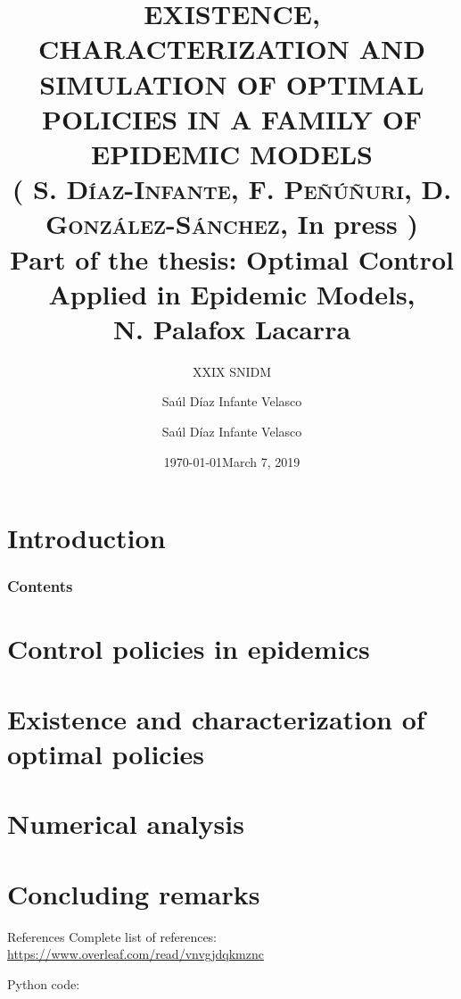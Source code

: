\documentclass[10pt]{beamer}
\title{
    EXISTENCE, CHARACTERIZATION AND SIMULATION OF OPTIMAL
    POLICIES IN A FAMILY OF EPIDEMIC MODELS
    \\
        \small{
            (%
                \textsc{%
                    S. D\'iaz-Infante, %
                    F. Pe\~n\'u\~nuri, %
                    D. Gonz\'alez-S\'anchez}, In press%
            )\\%
        Part of the thesis:
        Optimal Control Applied in Epidemic Models,
        \\
        N. Palafox Lacarra
        \\
        }{}
}
\subtitle{XXIX SNIDM}
\date{\today}
\author{Sa\'ul D\'iaz Infante Velasco}
\institute{CONACYT-Universidad de Sonora}
\author[Sa\'ul D\'iaz Infante Velasco]{
        Sa\'ul D\'iaz Infante Velasco
    }
\date[\ccbyncsa]{March 7, 2019 }
\begin{document}
    \begin{frame}[plain]
        \maketitle
    \end{frame}
    \section{Introduction}
        
        \begin{frame}
            \frametitle{Contents}
            \tableofcontents
        \end{frame}
    \section{Control policies in epidemics}
        
        
    \section{Existence and characterization of optimal policies}
        
        
    \section{Numerical analysis}
    	
        
    \section{Concluding remarks}
        
    \begin{frame}{References}
    Complete list of references:
    \href{https://www.overleaf.com/read/vnvgjdqkmznc%
    }{https://www.overleaf.com/read/vnvgjdqkmznc}
    
    Python code:
    \cite{python_repo}
    
\end{frame}
\end{document}

